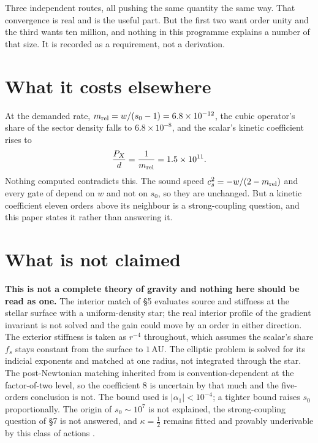 \documentclass[11pt,letterpaper]{article}
\begin{document}
Three independent routes, all pushing the same quantity the same way. That convergence is real and is the useful part. But the first two want order unity and the third wants ten million, and nothing in this programme explains a number of that size. It is recorded as a requirement, not a derivation.

\section{What it costs elsewhere}
At the demanded rate, $m_{\rm rel}=w/(s_0-1)=6.8\times10^{-12}$, the cubic operator's share of the sector density falls to $6.8\times10^{-8}$, and the scalar's kinetic coefficient rises to
\begin{equation}
\frac{P_X}{d}=\frac{1}{m_{\rm rel}}=1.5\times10^{11}.
\end{equation}
Nothing computed contradicts this. The sound speed $c_s^2=-w/(2-m_{\rm rel})$ and every gate of \cite{paper24} depend on $w$ and not on $s_0$, so they are unchanged. But a kinetic coefficient eleven orders above its neighbour is a strong-coupling question, and this paper states it rather than answering it.

\section{What is not claimed}
\textbf{This is not a complete theory of gravity and nothing here should be read as one.} The interior match of \S5 evaluates source and stiffness at the stellar surface with a uniform-density star; the real interior profile of the gradient invariant is not solved and the gain could move by an order in either direction. The exterior stiffness is taken as $r^{-4}$ throughout, which assumes the scalar's share $f_s$ stays constant from the surface to $1\,$AU. The elliptic problem is solved for its indicial exponents and matched at one radius, not integrated through the star. The post-Newtonian matching inherited from \cite{paper24} is convention-dependent at the factor-of-two level, so the coefficient $8$ is uncertain by that much and the five-orders conclusion is not. The bound used is $|\alpha_1|<10^{-4}$; a tighter bound raises $s_0$ proportionally. The origin of $s_0\sim10^7$ is not explained, the strong-coupling question of \S7 is not answered, and $\kappa=\tfrac12$ remains fitted and provably underivable by this class of actions \cite{repo}.
\end{document}
